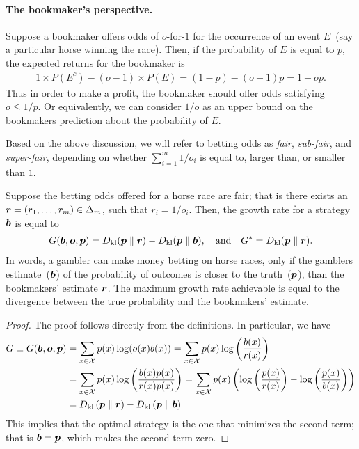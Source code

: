     \paragraph{The bookmaker's perspective.}  Suppose a bookmaker offers odds of $o$-for-$1$ for the occurrence of an event $E$~(say a particular horse winning the race). Then, if the probability of $E$ is equal to $p$,  the expected returns for the bookmaker is 
    \begin{align}
        1 \times P(E^c) -  (o-1) \times P(E) = (1-p) - (o-1)p= 1 - op.
    \end{align}
    Thus in order to make a profit, the bookmaker should offer odds satisfying $o \leq 1/p$. Or equivalently, we can consider $1/o$ as an upper bound on the bookmakers prediction about the probability of $E$. 

    Based on the above discussion, we will refer to betting odds as \emph{fair}, \emph{sub-fair}, and \emph{super-fair}, depending on whether $\sum_{i=1}^m 1/o_i$ is equal to, larger than, or smaller than $1$. 

    \begin{proposition}
        \label{prop:fair-horse-races} 
        Suppose the betting odds offered for a horse race are fair; that is there exists an $\boldsymbol{r} = (r_1,\ldots, r_m) \in \Delta_m$, such that $r_i = 1/o_i$. Then, the growth rate for a strategy $\boldsymbol{b}$ is equal to 
        \begin{align}
            G(\boldsymbol{b}, \boldsymbol{o}, \boldsymbol{p}) = D_{\text{kl}}(\boldsymbol{p} \parallel \boldsymbol{r}) - D_{\text{kl}}(\boldsymbol{p} \parallel \boldsymbol{b}), \quad \text{and} \quad G^* = D_{\text{kl}}(\boldsymbol{p} \parallel \boldsymbol{r}).  
        \end{align}
        In words, a gambler can make money betting on horse races, only if the gamblers estimate~($\boldsymbol{b}$) of the probability of outcomes is closer to the truth~($\boldsymbol{p}$), than the bookmakers' estimate $\boldsymbol{r}$. The maximum growth rate achievable is equal to the divergence between the true probability and the bookmakers' estimate. 
    \end{proposition}

    \begin{proof}
        The proof follows directly from the definitions. In particular, we have 
        \begin{align}
            G \equiv G(\boldsymbol{b}, \boldsymbol{o}, \boldsymbol{p}) &= \sum_{x \in \mathcal{X}} p(x) \log(o(x) b(x)) = \sum_{x \in \mathcal{X}} p(x) \log \left( \frac{b(x)}{r(x)} \right)  \\
            &= \sum_{x \in \mathcal{X}} p(x) \log \left( \frac{b(x) p(x)}{r(x) p(x)} \right) 
            = \sum_{x \in \mathcal{X}} p(x) \left(  \log \left( \frac{p(x)}{r(x)} \right) - \log \left( \frac{p(x)}{b(x)} \right) \right)  \\
            &= D_{\text{kl}} \left( \boldsymbol{p} \parallel \boldsymbol{r} \right)  - D_{\text{kl}} \left( \boldsymbol{p} \parallel \boldsymbol{b} \right). 
        \end{align}
        This implies that the optimal strategy is the one that minimizes the second term; that is $\boldsymbol{b} = \boldsymbol{p}$, which makes the second term zero. 
    \end{proof}

